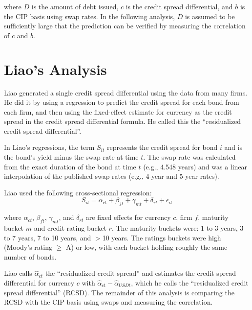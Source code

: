 \noindent where $D$ is the amount of debt issued, $c$ is the credit spread differential, and $b$ is the CIP basis using swap rates.  In the following analysis, $D$ is assumed to be sufficiently large that the prediction can be verified by measuring the correlation of $c$ and $b$.


\section{Liao's Analysis} \label{rcsd_section}

Liao generated a single credit spread differential using the data from many firms.  He did it by using a regression to predict the credit spread for each bond from each firm, and then using the fixed-effect estimate for currency as the credit spread in the credit spread differential formula.  He called this the ``residualized credit spread differential''. 

In Liao's regressions, the term $S_{it}$ represents the credit spread for bond $i$ and is the bond's yield minus the swap rate at time $t$.  The swap rate was calculated from the exact duration of the bond at time $t$ (e.g., 4.548 years) and was a linear interpolation of the published swap rates (e.g., 4-year and 5-year rates).\cite{Liao_email2}

Liao used the following cross-sectional regression:
\begin{equation}
  \label{liao_regression}
S_{it} = \alpha_{ct} + \beta_{ft} + \gamma_{mt} + \delta_{rt} + \epsilon_{it}
\end{equation}

\noindent where $\alpha_{ct}$, $\beta_{ft}$, $\gamma_{mt}$, and $\delta_{rt}$ are fixed effects for currency $c$, firm $f$, maturity bucket $m$ and credit rating bucket $r$.   The maturity buckets were: 1 to 3 years, 3 to 7 years, 7 to 10 years, and $>$10 years.  The ratings buckets were high (Moody's rating $\ge$ A) or low, with each bucket holding roughly the same number of bonds.

Liao calls $\hat{\alpha}_{ct}$ the ``residualized credit spread'' and estimates the credit spread differential for currency $c$ with $\hat{\alpha}_{ct} - \hat{\alpha}_{USDt}$, which he calls the ``residualized credit spread differential'' (RCSD).   The remainder of this analysis is comparing the RCSD with the CIP basis using swaps and measuring the correlation.\cite{Liao_email1}  

